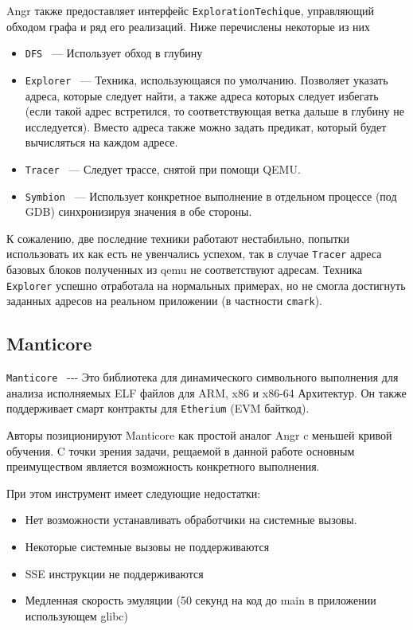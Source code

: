 Angr также предоставляет интерфейс \texttt{ExplorationTechique}, управляющий обходом графа и ряд его реализаций. Ниже перечислены некоторые из них

\begin{itemize}
    \item \texttt{DFS} ~--- Использует обход в глубину
    \item \texttt{Explorer} ~--- Техника, использующаяся по умолчанию. Позволяет указать адреса, которые следует найти, а также адреса которых следует избегать (если такой адрес встретился, то соответствующая ветка дальше в глубину не исследуется). Вместо адреса также можно задать предикат, который будет вычисляться на каждом адресе.
    \item \texttt{Tracer} ~--- Следует трассе, снятой при помощи QEMU.
    \item \texttt{Symbion} ~--- Использует конкретное выполнение в отдельном процессе (под GDB) синхронизируя значения в обе стороны.
\end{itemize}

К сожалению, две последние техники работают нестабильно, попытки использовать их как есть не увенчались успехом, так в случае \texttt{Tracer} адреса базовых блоков полученных из qemu не соответствуют адресам. Техника \texttt{Explorer} успешно отработала на нормальных примерах, но не смогла достигнуть заданных адресов на реальном приложении (в частности \texttt{cmark}).


\subsection{Manticore}

\texttt{Manticore} \cite{trailofbits-manticore}~-‑- Это библиотека для динамического символьного выполнения для анализа исполняемых ELF файлов для ARM, x86 и x86-64 Архитектур. Он также поддерживает смарт контракты для \texttt{Etherium} (EVM байткод).

Авторы позиционируют Manticore как простой аналог Angr c меньшей кривой обучения. C точки зрения задачи, рещаемой в данной работе основным преимуществом является возможность конкретного выполнения.

При этом инструмент имеет следующие недостатки:

\begin{itemize}
    \item Нет возможности устанавливать обработчики на системные вызовы.
    \item Некоторые системные вызовы не поддерживаются
    \item SSE инструкции не поддерживаются
    \item Медленная скорость эмуляции (50 секунд на код до main в приложении использующем glibc)
\end{itemize}



